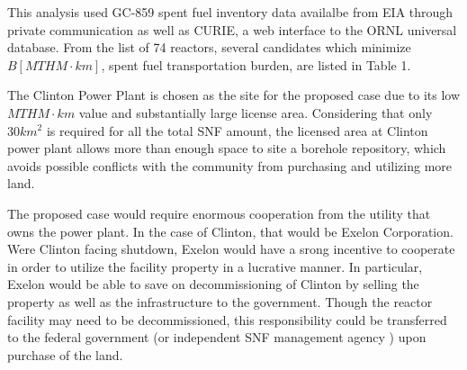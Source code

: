 This analysis used GC-859 spent fuel inventory data availalbe from \gls{EIA} 
through private communication \cite{domenico_GC-859_2016} as well as \gls{CURIE}, a web interface to 
the \gls{ORNL} universal database\cite{ornl_centralized_2016}.
From the list of 74 reactors, several candidates which minimize $B [MTHM\cdot 
km]$, spent fuel transportation burden, are listed in Table 1.
    
    \begin{table}[h]
    	\centering
    	
    	\caption {Reactors with relatively small spent fuel transportation burden $ [MTHM\cdot km]$.}
    		\end {table}




The Clinton Power Plant is chosen as the site for the proposed case due to its
low $MTHM\cdot km$ value and substantially large license 
area\cite{nrc_chapter_2007}.
Considering that only
$30km^2$ is required for all the total \gls{SNF} amount, the licensed area at Clinton
power plant allows more than  enough space to site a borehole repository, which
avoids possible conflicts with the community from purchasing and utilizing more
land. 

The proposed case would require enormous cooperation from the utility that owns
the power plant. In the case of Clinton, that would be Exelon Corporation. 
Were Clinton facing shutdown, Exelon would have a srong incentive to 
cooperate in order to utilize the facility property
in a lucrative manner. In particular, Exelon would be able to save on decommissioning of
Clinton by selling the property as well as the infrastructure to the 
government. Though the reactor facility may need to be decommissioned, 
this responsibility could be transferred to the federal government (or 
independent \gls{SNF} management agency \cite{ayers_blue_2012}) upon 
purchase of the land.


